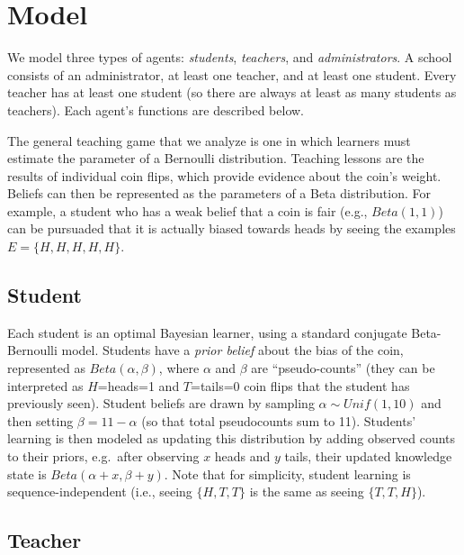 \documentclass[10pt, letterpaper]{article}
\begin{document}
\section{Model}\label{model}

We model three types of agents: \emph{students}, \emph{teachers}, and
\emph{administrators}. A school consists of an administrator, at least
one teacher, and at least one student. Every teacher has at least one
student (so there are always at least as many students as teachers).
Each agent's functions are described below.

The general teaching game that we analyze is one in which learners must
estimate the parameter of a Bernoulli distribution. Teaching lessons are
the results of individual coin flips, which provide evidence about the
coin's weight. Beliefs can then be represented as the parameters of a
Beta distribution. For example, a student who has a weak belief that a
coin is fair (e.g., \(Beta(1,1)\)) can be pursuaded that it is actually
biased towards heads by seeing the examples \(E = \{H, H, H, H, H\}\).

\subsection{Student}\label{student}

Each student is an optimal Bayesian learner, using a standard conjugate
Beta-Bernoulli model. Students have a \emph{prior belief} about the bias
of the coin, represented as \(Beta(\alpha,\beta)\), where \(\alpha\) and
\(\beta\) are ``pseudo-counts'' (they can be interpreted as
\(H\)=heads=1 and \(T\)=tails=0 coin flips that the student has
previously seen). Student beliefs are drawn by sampling
\(\alpha \sim Unif(1,10)\) and then setting \(\beta = 11 - \alpha\) (so
that total pseudocounts sum to 11). Students' learning is then modeled
as updating this distribution by adding observed counts to their priors,
e.g.~after observing \(x\) heads and \(y\) tails, their updated
knowledge state is \(Beta(\alpha + x, \beta + y)\). Note that for
simplicity, student learning is sequence-independent (i.e., seeing
\(\{H, T, T\}\) is the same as seeing \(\{T, T, H\}\)).

\subsection{Teacher}\label{teacher}
\end{document}
